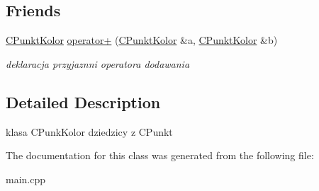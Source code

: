\subsection*{Friends}
\begin{CompactItemize}
\item 
\hypertarget{classCPunktKolor_d2b4ea749459d1165e7c5bcdef098a79}{
\hyperlink{classCPunktKolor}{CPunktKolor} \hyperlink{classCPunktKolor_d2b4ea749459d1165e7c5bcdef098a79}{operator+} (\hyperlink{classCPunktKolor}{CPunktKolor} \&a, \hyperlink{classCPunktKolor}{CPunktKolor} \&b)}
\label{classCPunktKolor_d2b4ea749459d1165e7c5bcdef098a79}

\begin{CompactList}\small\item\em deklaracja przyjaznni operatora dodawania \item\end{CompactList}\end{CompactItemize}


\subsection{Detailed Description}
klasa CPunkKolor dziedzicy z CPunkt 

The documentation for this class was generated from the following file:\begin{CompactItemize}
\item 
main.cpp\end{CompactItemize}
